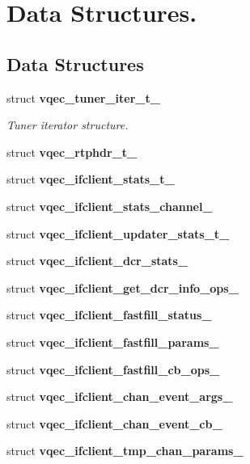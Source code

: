 \section{Data Structures.}
\label{group__structs}
\subsection*{Data Structures}
\begin{CompactItemize}
\item 
struct \bf{vqec\_\-tuner\_\-iter\_\-t\_\-}
\begin{CompactList}\small\item\em Tuner iterator structure. \item\end{CompactList}\item 
struct \bf{vqec\_\-rtphdr\_\-t\_\-}
\item 
struct \bf{vqec\_\-ifclient\_\-stats\_\-t\_\-}
\item 
struct \bf{vqec\_\-ifclient\_\-stats\_\-channel\_\-}
\item 
struct \bf{vqec\_\-ifclient\_\-updater\_\-stats\_\-t\_\-}
\item 
struct \bf{vqec\_\-ifclient\_\-dcr\_\-stats\_\-}
\item 
struct \bf{vqec\_\-ifclient\_\-get\_\-dcr\_\-info\_\-ops\_\-}
\item 
struct \bf{vqec\_\-ifclient\_\-fastfill\_\-status\_\-}
\item 
struct \bf{vqec\_\-ifclient\_\-fastfill\_\-params\_\-}
\item 
struct \bf{vqec\_\-ifclient\_\-fastfill\_\-cb\_\-ops\_\-}
\item 
struct \bf{vqec\_\-ifclient\_\-chan\_\-event\_\-args\_\-}
\item 
struct \bf{vqec\_\-ifclient\_\-chan\_\-event\_\-cb\_\-}
\item 
struct \bf{vqec\_\-ifclient\_\-tmp\_\-chan\_\-params\_\-}
\end{CompactItemize}
